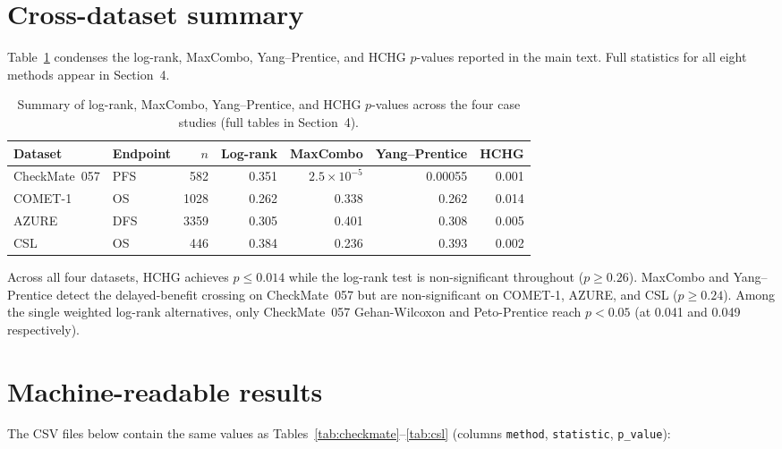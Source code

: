 \documentclass[11pt]{article}
\begin{document}
\section{Cross-dataset summary}

Table~\ref{tab:summary} condenses the log-rank, MaxCombo, Yang--Prentice,
and HCHG $p$-values reported in the main text.  Full statistics for all
eight methods appear in Section~4.

\begin{table}[h]
  \centering
  \caption{Summary of log-rank, MaxCombo, Yang--Prentice, and HCHG
           $p$-values across the four case studies (full tables in Section~4).}
  \label{tab:summary}
  \small
  \begin{tabular}{@{}llrrrrr@{}}
    \toprule
    Dataset & Endpoint & $n$ & Log-rank & MaxCombo & Yang--Prentice & HCHG \\
    \midrule
    CheckMate~057  & PFS &  582 & 0.351 & $2.5\times 10^{-5}$ & 0.00055 & 0.001 \\
    COMET-1        & OS  & 1028 & 0.262 & 0.338 & 0.262 & 0.014 \\
    AZURE          & DFS & 3359 & 0.305 & 0.401 & 0.308 & 0.005 \\
    CSL            & OS  &  446 & 0.384 & 0.236 & 0.393 & 0.002 \\
    \bottomrule
  \end{tabular}
\end{table}

\noindent
Across all four datasets, HCHG achieves $p \leq 0.014$ while the log-rank
test is non-significant throughout ($p \geq 0.26$). MaxCombo and
Yang--Prentice detect the delayed-benefit crossing on CheckMate~057 but
are non-significant on COMET-1, AZURE, and CSL ($p \geq 0.24$). Among the
single weighted log-rank alternatives, only CheckMate~057 Gehan-Wilcoxon
and Peto-Prentice reach $p < 0.05$ (at 0.041 and 0.049 respectively).

\section{Machine-readable results}

The CSV files below contain the same values as Tables~\ref{tab:checkmate}--\ref{tab:csl}
(columns \texttt{method}, \texttt{statistic}, \texttt{p\_value}):
\end{document}
